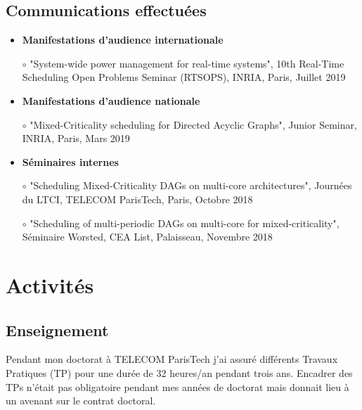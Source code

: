 \documentclass{article}
\begin{document}
\subsection{Communications effectuées}

\begin{itemize}
	\item \textbf{Manifestations d'audience internationale}
	
	$\circ$ "System-wide power management for real-time systems", 10th Real-Time Scheduling Open 
	Problems Seminar (RTSOPS), INRIA, Paris, Juillet 2019
	
	\item \textbf{Manifestations d'audience nationale}
	
	$\circ$ "Mixed-Criticality scheduling for
Directed Acyclic Graphs", Junior Seminar, INRIA, Paris, Mars 
	2019
	
	\item \textbf{Séminaires internes}
	
	$\circ$ "Scheduling Mixed-Criticality DAGs on multi-core
architectures", Journées du LTCI, TELECOM 
	ParisTech, Paris, Octobre 2018
	
	$\circ$ "Scheduling of multi-periodic DAGs on multi-core for mixed-criticality", Séminaire Worsted, CEA 
	List, Palaisseau, Novembre 2018
\end{itemize}


\section{Activités}


\subsection{Enseignement}

Pendant mon doctorat à TELECOM ParisTech j'ai assuré différents Travaux Pratiques (TP) pour une durée de 
32 heures/an pendant trois ans. Encadrer des TPs n'était pas obligatoire pendant mes années de doctorat 
mais donnait lieu à un avenant sur le contrat doctoral.
\vspace{.5cm}
\end{document}

